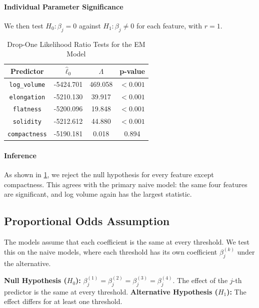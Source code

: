 \documentclass[12pt]{article}
\begin{document}
\paragraph{Individual Parameter Significance}
We then test $H_0 \colon \beta_j = 0$ against $H_1 \colon \beta_j \neq 0$ for
each feature, with $r = 1$.

\begin{table}[H]
  \centering
  \begin{tabular}{|| c | c | c | c ||}
    \hline
    \textbf{Predictor} & $\hat{\ell}_0$ & $\Lambda$
    & \textbf{p-value} \\[0.5ex]
    \hline\hline
    \texttt{log\_volume} & -5424.701 & 469.058 & $< 0.001$ \\
    \texttt{elongation} & -5210.130 & 39.917 & $< 0.001$ \\
    \texttt{flatness} & -5200.096 & 19.848 & $< 0.001$ \\
    \texttt{solidity} & -5212.612 & 44.880 & $< 0.001$ \\
    \texttt{compactness} & -5190.181 & 0.018 & 0.894 \\
    \hline
  \end{tabular}
  \caption{Drop-One Likelihood Ratio Tests for the EM Model}
  \label{table:lrt_drop_em}
\end{table}

\paragraph{Inference}
As shown in \cref{table:lrt_drop_em}, we reject the null hypothesis for
every feature except compactness. This agrees with the primary naive model:
the same four features are significant, and log volume again has the largest
statistic.

\subsection{Proportional Odds Assumption}

The models assume that each coefficient is the same at every threshold. We
test this on the naive models, where each threshold has its own coefficient
$\beta_j^{(k)}$ under the alternative.

\begin{itemize}
    \ii \textbf{Null Hypothesis ($H_0$):}
    $\beta_j^{(1)} = \beta_j^{(2)} = \beta_j^{(3)} = \beta_j^{(4)}$. The
    effect of the $j$-th predictor is the same at every threshold.
    \ii \textbf{Alternative Hypothesis ($H_1$):} The effect differs for at
    least one threshold.
\end{itemize}
\end{document}
